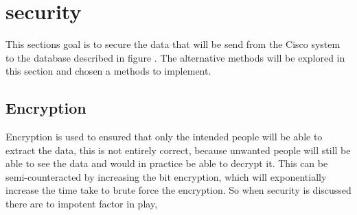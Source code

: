 \section{security}
This sections goal is to secure the data that will be send from the Cisco system to the database described in figure . The alternative methods will be explored in this section and chosen a methods to implement.

\subsection{Encryption}
Encryption is used to ensured that only the intended people will be able to extract the data, this is not entirely correct, because unwanted people will still be able to see the data and would in practice be able to decrypt it. This can be semi-counteracted by increasing the bit encryption, which will exponentially increase the time take to brute force the encryption. So when security is discussed there are to impotent factor in play,